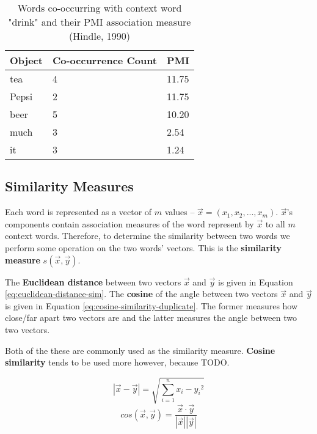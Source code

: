 \documentclass{article}
\begin{document}
\begin{table}
	\centering
	\begin{tabular}{|l|l|l|}
		\hline
		\textbf{Object} & \textbf{Co-occurrence Count} & \textbf{PMI} \\
		\hline
		tea & 4 & 11.75 \\
		Pepsi & 2 & 11.75 \\
		beer & 5 & 10.20 \\
		much & 3 & 2.54 \\
		it & 3 & 1.24 \\
		\hline
	\end{tabular}
	\caption{Words co-occurring with context word "drink" and their PMI association measure (Hindle, 1990)}
	\label{tab:pmu-association-example}
\end{table}

\subsection{Similarity Measures}
\label{sec:similarity-measures}

Each word is represented as a vector of $m$ values -- $\vec{x} = (x_1, x_2, ..., x_m)$. $\vec{x}$'s components contain association measures of the word represent by $\vec{x}$ to all $m$ context words. Therefore, to determine the similarity between two words we perform some operation on the two words' vectors. This is the \textbf{similarity measure} $s(\vec{x}, \vec{y})$.

The \textbf{Euclidean distance} between two vectors $\vec{x}$ and $\vec{y}$ is given in Equation \ref{eq:euclidean-distance-sim}. The \textbf{cosine} of the angle between two vectors $\vec{x}$ and $\vec{y}$ is given in Equation \ref{eq:cosine-similarity-duplicate}. The former measures how close/far apart two vectors are and the latter measures the angle between two two vectors.

Both of the these are commonly used as the similarity measure. \textbf{Cosine similarity} tends to be used more however, because TODO.

\begin{equation}
	|\vec{x} - \vec{y}| = \sqrt{ \sum_{i=1}^n {x_i - y_i}^2 }
	\label{eq:euclidean-distance-sim}
\end{equation}
\begin{equation}
	cos(\vec{x}, \vec{y}) = \frac{\vec{x} \cdot \vec{y}}{|\vec{x}| |\vec{y}|}
	\label{eq:cosine-similarity-duplicate}
\end{equation}
\end{document}
